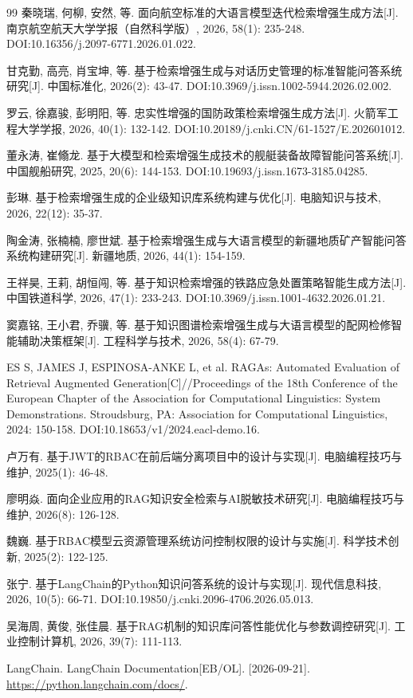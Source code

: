 \begin{thebibliography}{99}
秦晓瑞, 何柳, 安然, 等. 面向航空标准的大语言模型迭代检索增强生成方法[J]. 南京航空航天大学学报（自然科学版）, 2026, 58(1): 235-248. DOI:10.16356/j.2097-6771.2026.01.022.

甘克勤, 高亮, 肖宝坤, 等. 基于检索增强生成与对话历史管理的标准智能问答系统研究[J]. 中国标准化, 2026(2): 43-47. DOI:10.3969/j.issn.1002-5944.2026.02.002.

罗云, 徐嘉骏, 彭明阳, 等. 忠实性增强的国防政策检索增强生成方法[J]. 火箭军工程大学学报, 2026, 40(1): 132-142. DOI:10.20189/j.cnki.CN/61-1527/E.202601012.

董永涛, 崔翛龙. 基于大模型和检索增强生成技术的舰艇装备故障智能问答系统[J]. 中国舰船研究, 2025, 20(6): 144-153. DOI:10.19693/j.issn.1673-3185.04285.

彭琳. 基于检索增强生成的企业级知识库系统构建与优化[J]. 电脑知识与技术, 2026, 22(12): 35-37.

陶金涛, 张楠楠, 廖世斌. 基于检索增强生成与大语言模型的新疆地质矿产智能问答系统构建研究[J]. 新疆地质, 2026, 44(1): 154-159.

王祥昊, 王莉, 胡恒闯, 等. 基于知识检索增强的铁路应急处置策略智能生成方法[J]. 中国铁道科学, 2026, 47(1): 233-243. DOI:10.3969/j.issn.1001-4632.2026.01.21.

窦嘉铭, 王小君, 乔骥, 等. 基于知识图谱检索增强生成与大语言模型的配网检修智能辅助决策框架[J]. 工程科学与技术, 2026, 58(4): 67-79.

ES S, JAMES J, ESPINOSA-ANKE L, et al. RAGAs: Automated Evaluation of Retrieval Augmented Generation[C]//Proceedings of the 18th Conference of the European Chapter of the Association for Computational Linguistics: System Demonstrations. Stroudsburg, PA: Association for Computational Linguistics, 2024: 150-158. DOI:10.18653/v1/2024.eacl-demo.16.

卢万有. 基于JWT的RBAC在前后端分离项目中的设计与实现[J]. 电脑编程技巧与维护, 2025(1): 46-48.

廖明焱. 面向企业应用的RAG知识安全检索与AI脱敏技术研究[J]. 电脑编程技巧与维护, 2026(8): 126-128.

魏巍. 基于RBAC模型云资源管理系统访问控制权限的设计与实施[J]. 科学技术创新, 2025(2): 122-125.

张宁. 基于LangChain的Python知识问答系统的设计与实现[J]. 现代信息科技, 2026, 10(5): 66-71. DOI:10.19850/j.cnki.2096-4706.2026.05.013.

吴海周, 黄俊, 张佳晨. 基于RAG机制的知识库问答性能优化与参数调控研究[J]. 工业控制计算机, 2026, 39(7): 111-113.

LangChain. LangChain Documentation[EB/OL]. [2026-09-21]. \url{https://python.langchain.com/docs/}.

\end{thebibliography}
